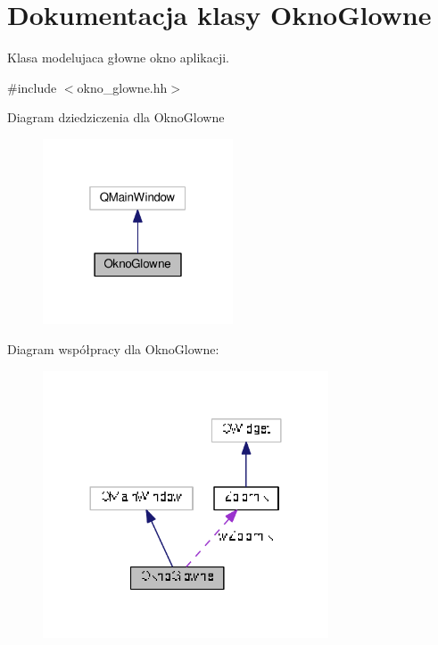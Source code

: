 \hypertarget{class_okno_glowne}{}\section{Dokumentacja klasy Okno\+Glowne}
\label{class_okno_glowne}


Klasa modelujaca głowne okno aplikacji.  




{\ttfamily \#include $<$okno\+\_\+glowne.\+hh$>$}



Diagram dziedziczenia dla Okno\+Glowne\nopagebreak
\begin{figure}[H]
\begin{center}
\leavevmode
\includegraphics[width=160pt]{class_okno_glowne__inherit__graph}
\end{center}
\end{figure}


Diagram współpracy dla Okno\+Glowne\+:
\nopagebreak
\begin{figure}[H]
\begin{center}
\leavevmode
\includegraphics[width=240pt]{class_okno_glowne__coll__graph}
\end{center}
\end{figure}
